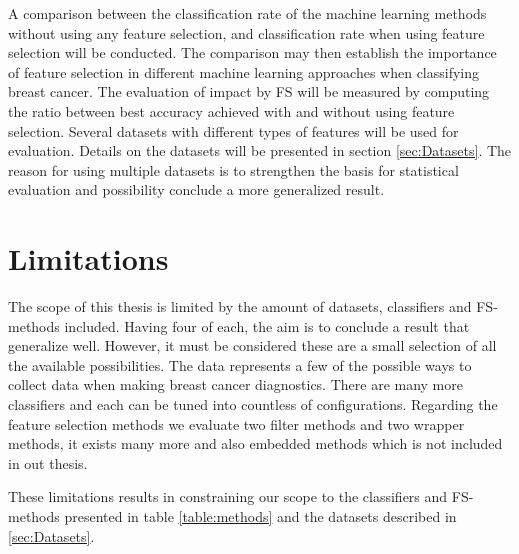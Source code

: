A comparison between the classification rate of the machine learning methods without using any feature selection, and classification rate when using feature selection will be conducted. The comparison may then establish the importance of feature selection in different machine learning approaches when classifying breast cancer. The evaluation of impact by FS will be measured by computing the ratio between best accuracy achieved with and without using feature selection. Several datasets with different types of features will be used for evaluation. Details on the datasets will be presented in section \ref{sec:Datasets}. The reason for using multiple datasets is to strengthen the basis for statistical evaluation and possibility conclude a more generalized result.


\section{Limitations}

The scope of this thesis is limited by the amount of datasets, classifiers and FS-methods included. Having four of each, the aim is to conclude a result that generalize well. However, it must be considered these are a small selection of all the available possibilities. The data represents a few of the possible ways to collect data when making breast cancer diagnostics. There are many more classifiers and each can be tuned into countless of configurations. Regarding the feature selection methods we evaluate two filter methods and two wrapper methods, it exists many more and also embedded methods which is not included in out thesis.

These limitations results in constraining our scope to the classifiers and FS-methods presented in table \ref{table:methods} and the datasets described in \ref{sec:Datasets}.
